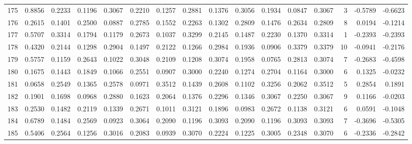 \begin{tabular}{lrrrrrrrrrrrrrrr}
175 &      0.8856 &  0.2233 &  0.1196 &  0.3067 &  0.2210 &  0.1257 &  0.2881 &  0.1376 &  0.3056 &  0.1934 &   0.0847 &     0.3067 &      3 &                   -0.5789 &                    -0.6623 \\
176 &      0.2615 &  0.1401 &  0.2500 &  0.0887 &  0.2785 &  0.1552 &  0.2263 &  0.1302 &  0.2809 &  0.1476 &   0.2634 &     0.2809 &      8 &                    0.0194 &                    -0.1214 \\
177 &      0.5707 &  0.3314 &  0.1794 &  0.1179 &  0.2673 &  0.1037 &  0.3299 &  0.2145 &  0.1487 &  0.2230 &   0.1370 &     0.3314 &      1 &                   -0.2393 &                    -0.2393 \\
178 &      0.4320 &  0.2144 &  0.1298 &  0.2904 &  0.1497 &  0.2122 &  0.1266 &  0.2984 &  0.1936 &  0.0906 &   0.3379 &     0.3379 &     10 &                   -0.0941 &                    -0.2176 \\
179 &      0.5757 &  0.1159 &  0.2643 &  0.1022 &  0.3048 &  0.2109 &  0.1208 &  0.3074 &  0.1958 &  0.0765 &   0.2813 &     0.3074 &      7 &                   -0.2683 &                    -0.4598 \\
180 &      0.1675 &  0.1443 &  0.1849 &  0.1066 &  0.2551 &  0.0907 &  0.3000 &  0.2240 &  0.1274 &  0.2704 &   0.1164 &     0.3000 &      6 &                    0.1325 &                    -0.0232 \\
181 &      0.0658 &  0.2549 &  0.1365 &  0.2578 &  0.0971 &  0.3512 &  0.1439 &  0.2608 &  0.1102 &  0.3256 &   0.2062 &     0.3512 &      5 &                    0.2854 &                     0.1891 \\
182 &      0.1901 &  0.1698 &  0.0968 &  0.2880 &  0.1623 &  0.2064 &  0.1376 &  0.2296 &  0.1346 &  0.3067 &   0.2250 &     0.3067 &      9 &                    0.1166 &                    -0.0203 \\
183 &      0.2530 &  0.1482 &  0.2119 &  0.1339 &  0.2671 &  0.1011 &  0.3121 &  0.1896 &  0.0983 &  0.2672 &   0.1138 &     0.3121 &      6 &                    0.0591 &                    -0.1048 \\
184 &      0.6789 &  0.1484 &  0.2569 &  0.0923 &  0.3064 &  0.2090 &  0.1196 &  0.3093 &  0.2090 &  0.1196 &   0.3093 &     0.3093 &      7 &                   -0.3696 &                    -0.5305 \\
185 &      0.5406 &  0.2564 &  0.1256 &  0.3016 &  0.2083 &  0.0939 &  0.3070 &  0.2224 &  0.1225 &  0.3005 &   0.2348 &     0.3070 &      6 &                   -0.2336 &                    -0.2842 \\

\end{tabular}
